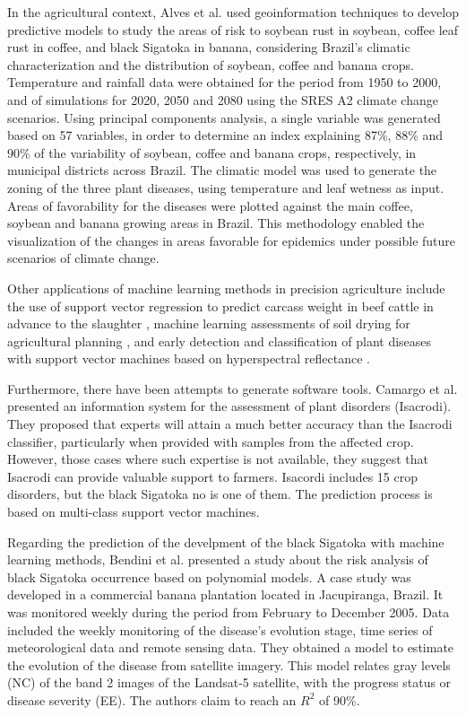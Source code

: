 \documentclass[review,authoryear,english]{elsarticle}
\begin{document}
In the agricultural context, Alves et al. \citep{Alves2011} used  geoinformation techniques to develop predictive models to study the areas of risk to soybean rust in soybean, coffee leaf rust in coffee, and black Sigatoka in banana, considering Brazil’s climatic characterization and the distribution of soybean, coffee and banana crops. Temperature and rainfall data were obtained for the period from 1950 to 2000, and of simulations for 2020, 2050 and 2080 using the SRES A2 climate change scenarios. Using principal components analysis, a single variable was generated based on 57 variables, in order to determine an index explaining 87\%, 88\% and 90\% of the variability of soybean, coffee and banana crops, respectively, in municipal districts across Brazil. The climatic model was used to generate the zoning of the three plant diseases, using temperature and leaf wetness as input. Areas of favorability for the diseases were plotted against the main coffee, soybean and banana growing areas in Brazil. This methodology enabled the visualization of the changes in areas favorable for epidemics under possible future scenarios of climate change.

Other applications of machine learning methods in precision agriculture include the use of support vector regression to predict carcass weight in beef cattle in advance to the slaughter  \citep{Alonso2013}, machine learning assessments of soil drying for agricultural planning \citep{Coopersmith2014}, and early detection and classification of plant diseases with support vector machines based on hyperspectral reflectance \citep{Rumpf2010}.

Furthermore, there have been attempts to generate software tools. Camargo et al. \citep{Camargo2012} presented an information system for the assessment of plant disorders (Isacrodi). They proposed that experts will attain a much better accuracy than the Isacrodi classifier, particularly when provided with samples from the affected crop. However, those cases where such expertise is not available, they suggest that Isacrodi can provide valuable support to farmers. Isacordi includes 15 crop disorders, but the black Sigatoka no is one of them. The prediction process is based on multi-class support vector machines.

Regarding the prediction of the develpment of the black Sigatoka with machine learning methods, Bendini et al. \citep{Bendini2013}  presented a study about the risk analysis of black Sigatoka occurrence based on polynomial models. A case study was developed in a commercial banana plantation located in Jacupiranga, Brazil. It was monitored weekly during the period from February to December 2005. Data included the weekly monitoring of the disease’s evolution stage, time series of meteorological data and remote sensing data. They obtained a model to estimate the evolution of the disease from satellite imagery. This model relates gray levels (NC) of the band 2 images of the Landsat-5 satellite, with the progress status or disease severity (EE). The authors claim to reach an $R^2$ of 90\%.
\end{document}
